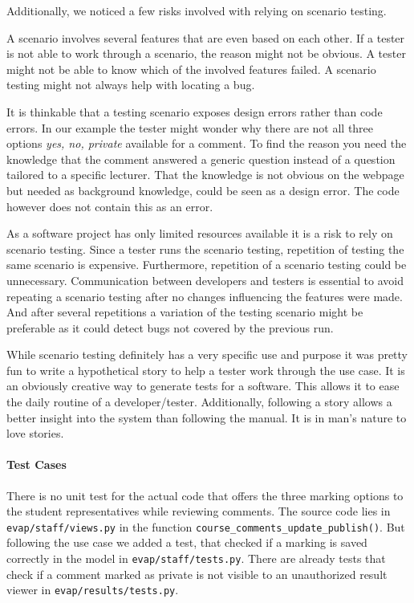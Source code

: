 Additionally, we noticed a few risks involved with relying on scenario testing.

A scenario involves several features that are even based on each other.
If a tester is not able to work through a scenario, the reason might not be obvious.
A tester might not be able to know which of the involved features failed.
A scenario testing might not always help with locating a bug.

It is thinkable that a testing scenario exposes design errors rather than code errors.
In our example the tester might wonder why there are not all three options \emph{yes, no, private} available for a comment. 
To find the reason you need the knowledge that the comment answered a generic question instead of a question tailored to a specific lecturer.
That the knowledge is not obvious on the webpage but needed as background knowledge, could be seen as a design error.
The code however does not contain this as an error.

As a software project has only limited resources available it is a risk to rely on scenario testing.
Since a tester runs the scenario testing, repetition of testing the same scenario is expensive.
Furthermore, repetition of a scenario testing could be unnecessary.
Communication between developers and testers is essential to avoid repeating a scenario testing after no changes influencing the features were made.
And after several repetitions a variation of the testing scenario might be preferable as it could detect bugs not covered by the previous run.

While scenario testing definitely has a very specific use and purpose it was pretty fun to write a hypothetical story to help a tester work through the use case.
It is an obviously creative way to generate tests for a software.
This allows it to ease the daily routine of a developer/tester.
Additionally, following a story allows a better insight into the system than following the manual.
It is in man's nature to love stories.

\paragraph{Test Cases}
There is no unit test for the actual code that offers the three marking options to the student representatives while reviewing comments.
The source code lies in \texttt{evap/staff/views.py} in the function \texttt{course\_comments\_update\_publish()}.
But following the use case we added a test, that checked if a marking is saved correctly in the model in \texttt{evap/staff/tests.py}.
There are already tests that check if a comment marked as private is not visible to an unauthorized result viewer in \texttt{evap/results/tests.py}.

